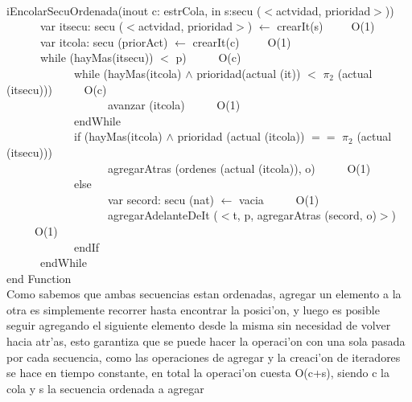 \documentclass[a4paper,10pt]{article}
\begin{document}
\begin{algoritmo}
\caption{}\\
  iEncolarSecuOrdenada(inout c: estrCola, in s:secu ($<$actvidad, prioridad$>$))\\
  \indent \ \ \ \ \ \ var itsecu: secu ($<$actvidad, prioridad$>$) $\gets$ crearIt(s)\ \ \ \ \ O(1)\\
	\indent \ \ \ \ \ \ var itcola: secu (priorAct) $\gets$ crearIt(c)\ \ \ \ \ O(1)\\
	\indent \ \ \ \ \ \ while (hayMas(itsecu)) $<$ p) \ \ \ \ \ O(c)\\
	\indent \ \ \ \ \ \ \ \ \ \ \ \ while (hayMas(itcola) $\wedge$  prioridad(actual (it)) $<$ $\pi_2$ (actual (itsecu))) \ \ \ \ \ O(c)\\
	\indent \ \ \ \ \ \ \ \ \ \ \ \ \ \ \ \ \ \ avanzar (itcola) \ \ \ \ \ O(1)\\
	\indent \ \ \ \ \ \ \ \ \ \ \ \ endWhile \ \ \ \ \ \\
	\indent \ \ \ \ \ \ \ \ \ \ \ \ if (hayMas(itcola) $\wedge$ prioridad (actual (itcola)) $==$ $\pi_2$ (actual (itsecu)))  \ \ \ \ \ \\
	\indent \ \ \ \ \ \ \ \ \ \ \ \ \ \ \ \ \ \ agregarAtras (ordenes (actual (itcola)), o) \ \ \ \ \ O(1)\\
	\indent \ \ \ \ \ \ \ \ \ \ \ \ else\ \ \ \ \ \\
	\indent \ \ \ \ \ \ \ \ \ \ \ \ \ \ \ \ \ \ var secord: secu (nat) $\gets$ vacia \ \ \ \ \ O(1)\\
	\indent \ \ \ \ \ \ \ \ \ \ \ \ \ \ \ \ \ \ agregarAdelanteDeIt ($<$t, p, agregarAtras (secord, o)$>$) \ \ \ \ \ O(1)\\
	\indent \ \ \ \ \ \ \ \ \ \ \ \ endIf \ \ \ \ \ \\
	\indent \ \ \ \ \ \ endWhile \ \ \ \ \ \\
   end Function \\
   
   Como sabemos que ambas secuencias estan ordenadas, agregar un elemento a la otra es simplemente recorrer hasta encontrar la posici'on, y luego es posible seguir agregando el siguiente elemento desde la misma sin necesidad de volver hacia atr'as, esto garantiza que se puede hacer la operaci'on con una sola pasada por cada secuencia, como las operaciones de agregar y la creaci'on de iteradores se hace en tiempo constante, en total la operaci'on cuesta O(c+s), siendo c la cola y s la secuencia ordenada a agregar
\end{algoritmo}
\end{document}
